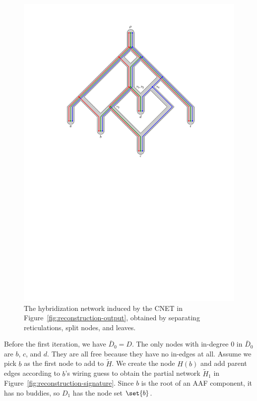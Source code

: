 \begin{figure}
  \centering
  \includegraphics{../figs/ch4/reconstruction-final-network}
  \caption{The hybridization network induced by the CNET in
    Figure~\ref{fig:reconstruction-output}, obtained by separating reticulations,
    split nodes, and leaves.}
  \label{fig:reconstruction-final}
\end{figure}


Before the first iteration, we have $\bar D_0 = D$.
The only nodes with in-degree $0$ in $\bar D_0$ are $b$, $c$, and $d$.
They are all free because they have no in-edges at all.
Assume we pick $b$ as the first node to add to $\tilde H$.
We create the node $H(b)$ and add parent edges according to $b$'s wiring guess
to obtain the partial network $\tilde H_1$ in
Figure~\ref{fig:reconstruction-signature}.
Since $b$ is the root of an AAF component, it has no buddies, so
$D_1$ has the node set $\set{b}$.

